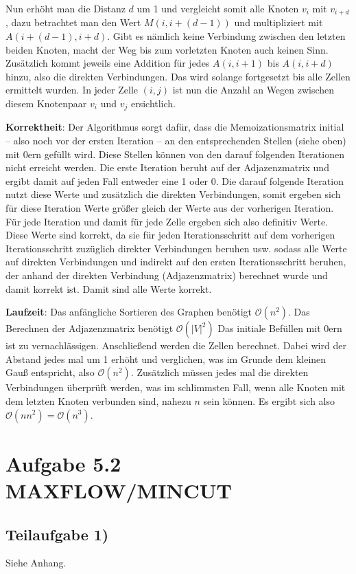 \documentclass[a4paper, fontsize=10pt]{scrartcl}
\begin{document}
Nun erhöht man die Distanz $d$ um 1 und vergleicht somit alle Knoten $v_i$ mit $v_{i+d}$, dazu betrachtet man den Wert $M(i,i+(d-1))$ und multipliziert mit $A(i+(d-1),i+d)$. Gibt es nämlich keine Verbindung zwischen den letzten beiden Knoten, macht der Weg bis zum vorletzten Knoten auch keinen Sinn. Zusätzlich kommt jeweils eine Addition für jedes $A(i,i+1)$ bis $A(i,i+d)$ hinzu, also die direkten Verbindungen. Das wird solange fortgesetzt bis alle Zellen ermittelt wurden. In jeder Zelle $(i,j)$ ist nun die Anzahl an Wegen zwischen diesem Knotenpaar $v_i$ und $v_j$ ersichtlich.\bigskip

\textbf{Korrektheit}: Der Algorithmus sorgt dafür, dass die Memoizationsmatrix initial -- also noch vor der ersten Iteration -- an den entsprechenden Stellen (siehe oben) mit 0ern gefüllt wird. Diese Stellen können von den darauf folgenden Iterationen nicht erreicht werden. Die erste Iteration beruht auf der Adjazenzmatrix und ergibt damit auf jeden Fall entweder eine 1 oder 0. Die darauf folgende Iteration nutzt diese Werte und zusätzlich die direkten Verbindungen, somit ergeben sich für diese Iteration Werte größer gleich der Werte aus der vorherigen Iteration. Für jede Iteration und damit für jede Zelle ergeben sich also definitiv Werte. Diese Werte sind korrekt, da sie für jeden Iterationsschritt auf dem vorherigen Iterationsschritt zuzüglich direkter Verbindungen beruhen usw. sodass alle Werte auf direkten Verbindungen und indirekt auf den ersten Iterationsschritt beruhen, der anhand der direkten Verbindung (Adjazenzmatrix) berechnet wurde und damit korrekt ist. Damit sind alle Werte korrekt.\bigskip

\textbf{Laufzeit}: Das anfängliche Sortieren des Graphen benötigt $\mathcal{O}(n^2)$. Das Berechnen der Adjazenzmatrix benötigt $\mathcal{O}(|V|^2)$ Das initiale Befüllen mit 0ern ist zu vernachlässigen. Anschließend werden die Zellen berechnet. Dabei wird der Abstand jedes mal um 1 erhöht und verglichen, was im Grunde dem kleinen Gauß entspricht, also $\mathcal{O}(n^2)$. Zusätzlich müssen jedes mal die direkten Verbindungen überprüft werden, was im schlimmsten Fall, wenn alle Knoten mit dem letzten Knoten verbunden sind, nahezu $n$ sein können. Es ergibt sich also $\mathcal{O}(nn^2)=\mathcal{O}(n^3)$.

\section*{Aufgabe 5.2 MAXFLOW/MINCUT}
\subsection*{Teilaufgabe 1)}
Siehe Anhang.
\end{document}
